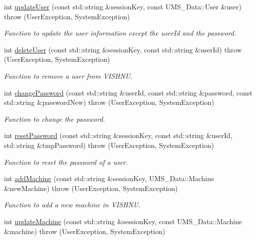 \begin{DoxyCompactItemize}
int \hyperlink{namespacevishnu_a1446b24fda1ed0ca910686635b6bb956}{updateUser} (const std::string \&sessionKey, const UMS\_\-Data::User \&user)  throw (UserException, SystemException)
\begin{DoxyCompactList}\small\item\em Function to update the user information except the userId and the password. \item\end{DoxyCompactList}\item 
int \hyperlink{namespacevishnu_a6c83f6b72fdb7ac3b240f14a19f11786}{deleteUser} (const std::string \&sessionKey, const std::string \&userId)  throw (UserException, SystemException)
\begin{DoxyCompactList}\small\item\em Function to remove a user from VISHNU. \item\end{DoxyCompactList}\item 
int \hyperlink{namespacevishnu_a24ec95c164ce8905b8eccf98e9bb633e}{changePassword} (const std::string \&userId, const std::string \&password, const std::string \&passwordNew)  throw (UserException, SystemException)
\begin{DoxyCompactList}\small\item\em Function to change the password. \item\end{DoxyCompactList}\item 
int \hyperlink{namespacevishnu_a11f16b7501b8814c491d13431409051c}{resetPassword} (const std::string \&sessionKey, const std::string \&userId, std::string \&tmpPassword)  throw (UserException, SystemException)
\begin{DoxyCompactList}\small\item\em Function to reset the password of a user. \item\end{DoxyCompactList}\item 
int \hyperlink{namespacevishnu_aca4f5c2716ce1dd8ddc15a2554c95004}{addMachine} (const std::string \&sessionKey, UMS\_\-Data::Machine \&newMachine)  throw (UserException, SystemException)
\begin{DoxyCompactList}\small\item\em Function to add a new machine in VISHNU. \item\end{DoxyCompactList}\item 
int \hyperlink{namespacevishnu_a1f8fe4e8fa5956be1f264e9a5f78c9f1}{updateMachine} (const std::string \&sessionKey, const UMS\_\-Data::Machine \&machine)  throw (UserException, SystemException)

\end{DoxyCompactItemize}
